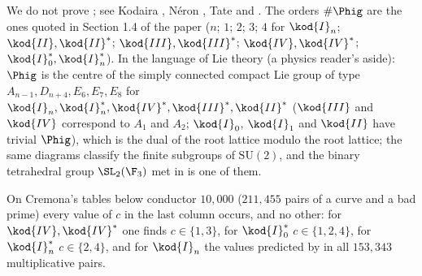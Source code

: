 We do not prove ; see Kodaira \cite{Kodaira}, N\'eron \cite{NeronModels}, Tate
\cite{Tate75} and \cite[IV.8, IV.9 and Table 4.1]{SilvermanATAEC}. The orders $\#\Phig$ are the ones quoted in Section
1.4 of the paper ($n$; $1$; $2$; $3$; $4$ for $\kod{I}_n$; $\kod{II},\kod{II}^*$; $\kod{III},\kod{III}^*$;
$\kod{IV},\kod{IV}^*$; $\kod{I}_0^*,\kod{I}_n^*$). In the language of Lie theory (a physics reader's aside): $\Phig$
is the centre of the simply connected compact Lie group of type $A_{n-1},D_{n+4},E_6,E_7,E_8$ for $\kod{I}_n,\kod{I}_n^*,\kod{IV}^*,\kod{III}^*,\kod{II}^*$
($\kod{III}$ and $\kod{IV}$ correspond to $A_1$ and $A_2$; $\kod{I}_0$, $\kod{I}_1$ and $\kod{II}$ have trivial $\Phig$), which is the dual
of the root lattice modulo the root lattice; the same diagrams classify the finite subgroups of $\mathrm{SU}(2)$, and
the binary tetrahedral group $\SL_2(\F_3)$ met in  is one of them.

On Cremona's tables below conductor $10{,}000$ ($211{,}455$ pairs of a curve and a bad prime) every value of $c$ in
the last column occurs, and no other: for $\kod{IV},\kod{IV}^*$ one finds $c\in\{1,3\}$, for $\kod{I}_0^*$
$c\in\{1,2,4\}$, for $\kod{I}_n^*$ $c\in\{2,4\}$, and for $\kod{I}_n$ the values predicted by
 in all $153{,}343$ multiplicative pairs.


